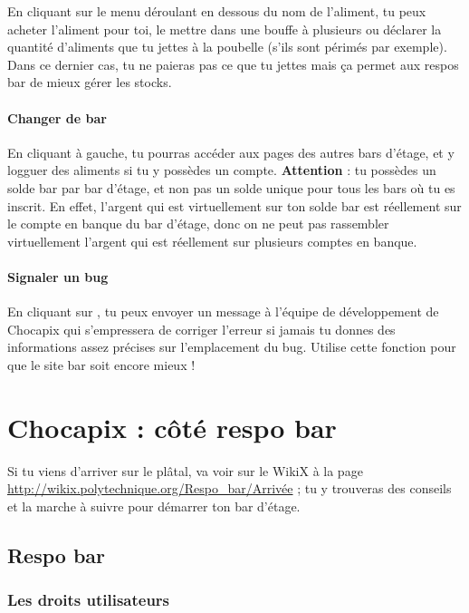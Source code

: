 \documentclass[12pt,french]{article}
\begin{document}
En cliquant sur le menu déroulant en dessous du nom de l'aliment, tu peux acheter l'aliment pour toi, le mettre dans une bouffe à plusieurs ou déclarer la quantité d'aliments que tu jettes à la poubelle (s'ils sont périmés par exemple). Dans ce dernier cas, tu ne paieras pas ce que tu jettes mais ça permet aux respos bar de mieux gérer les stocks.

\paragraph{Changer de bar} En cliquant  à gauche, tu pourras accéder aux pages des autres bars d'étage, et y logguer des aliments si tu y possèdes un compte. \textbf{Attention} : tu possèdes un solde bar par bar d'étage, et non pas un solde unique pour tous les bars où tu es inscrit. En effet, l'argent qui est virtuellement sur ton solde bar est réellement sur le compte en banque du bar d'étage, donc on ne peut pas rassembler virtuellement l'argent qui est réellement sur plusieurs comptes en banque.

\paragraph{Signaler un bug} En cliquant sur , tu peux envoyer un message à l'équipe de développement de Chocapix qui s'empressera de corriger l'erreur si jamais tu donnes des informations assez précises sur l'emplacement du bug. Utilise cette fonction pour que le site bar soit encore mieux !


\section{Chocapix : côté respo bar}

Si tu viens d'arriver sur le plâtal, va voir sur le WikiX à la page \url{http://wikix.polytechnique.org/Respo_bar/Arrivée} ; tu y trouveras des conseils et la marche à suivre pour démarrer ton bar d'étage.

\subsection{Respo bar}

\subsubsection{Les droits utilisateurs}
\end{document}
